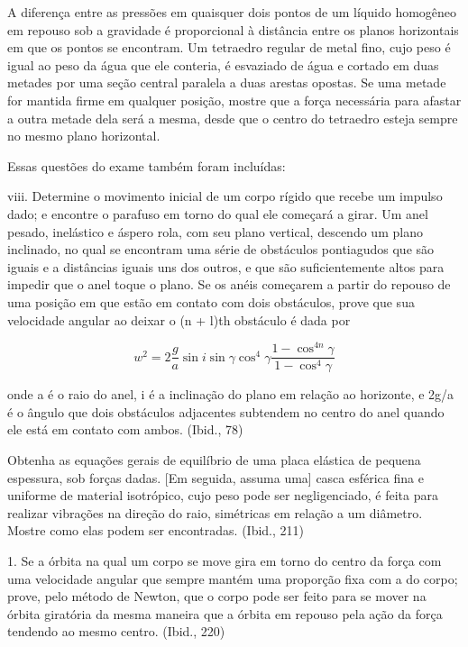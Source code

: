 \documentclass[12pt]{article}
\begin{document}
A diferença entre as pressões em quaisquer dois pontos de um líquido homogêneo em repouso sob a gravidade é proporcional à distância entre os planos horizontais em que os pontos se encontram. Um tetraedro regular de metal fino, cujo peso é igual ao peso da água que ele conteria, é esvaziado de água e cortado em duas metades por uma seção central paralela a duas arestas opostas. Se uma metade for mantida firme em qualquer posição, mostre que a força necessária para afastar a outra metade dela será a mesma, desde que o centro do tetraedro esteja sempre no mesmo plano horizontal.

Essas questões do exame também foram incluídas:

viii. Determine o movimento inicial de um corpo rígido que recebe um impulso dado; e encontre o parafuso em torno do qual ele começará a girar. Um anel pesado, inelástico e áspero rola, com seu plano vertical, descendo um plano inclinado, no qual se encontram uma série de obstáculos pontiagudos que são iguais e a distâncias iguais uns dos outros, e que são suficientemente altos para impedir que o anel toque o plano. Se os anéis começarem a partir do repouso de uma posição em que estão em contato com dois obstáculos, prove que sua velocidade angular ao deixar o (n + l)th obstáculo é dada por

$$ w^2 = 2 \frac{g}{a} \sin i \sin \gamma \cos^4\gamma \frac{1 - \cos^{4n}\gamma}{1 - \cos^4\gamma}  $$

onde a é o raio do anel, i é a inclinação do plano em relação ao horizonte, e 2g/a é o ângulo que dois obstáculos adjacentes subtendem no centro do anel quando ele está em contato com ambos. (Ibid., 78)

Obtenha as equações gerais de equilíbrio de uma placa elástica de pequena espessura, sob forças dadas. [Em seguida, assuma uma] casca esférica fina e uniforme de material isotrópico, cujo peso pode ser negligenciado, é feita para realizar vibrações na direção do raio, simétricas em relação a um diâmetro. Mostre como elas podem ser encontradas. (Ibid., 211)

1. Se a órbita na qual um corpo se move gira em torno do centro da força com uma velocidade angular que sempre mantém uma proporção fixa com a do corpo; prove, pelo método de Newton, que o corpo pode ser feito para se mover na órbita giratória da mesma maneira que a órbita em repouso pela ação da força tendendo ao mesmo centro. (Ibid., 220)
\end{document}
